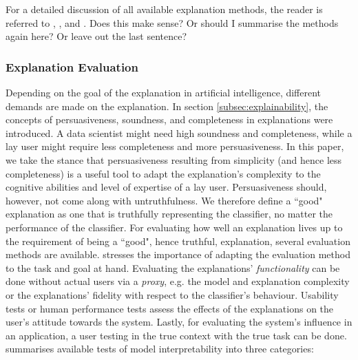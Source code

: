 For a detailed discussion of all available explanation methods, the reader is referred to \cite{liu2017towards}, \cite{gilpin2018explaining}, and \cite{ventocilla2018taxonomy}.\newline
{\color{blue}Does this make sense? Or should I summarise the methods again here? Or leave out the last sentence?}\newline



\subsubsection{Explanation Evaluation}
Depending on the goal of the explanation in artificial intelligence, different demands are made on the explanation. In section \ref{subsec:explainability}, the concepts of persuasiveness, soundness, and completeness in explanations were introduced. A data scientist might need high soundness and completeness, while a lay user might require less completeness and more persuasiveness. In this paper, we take the stance that persuasiveness resulting from simplicity (and hence less completeness) is a useful tool to adapt the explanation's complexity to the cognitive abilities and level of expertise of a lay user. Persuasiveness should, however, not come along with untruthfulness. We therefore define a ``good" explanation as one that is truthfully representing the classifier, no matter the performance of the classifier.\newline
For evaluating how well an explanation lives up to the requirement of being a ``good", hence truthful, explanation, several evaluation methods are available. \cite{gilpin2018explaining} stresses the importance of adapting the evaluation method to the task and goal at hand. Evaluating the explanations' \textit{functionality} can be done without actual users via a \textit{proxy}, e.g. the model and explanation complexity or the explanations' fidelity with respect to the classifier's behaviour. Usability tests or human performance tests assess the effects of the explanations on the user's attitude towards the system. Lastly, for evaluating the system's influence in an application, a user testing in the true context with the true task can be done.\newline
\cite{bibal2016interpretability} summarises available tests of model interpretability into three categories:
